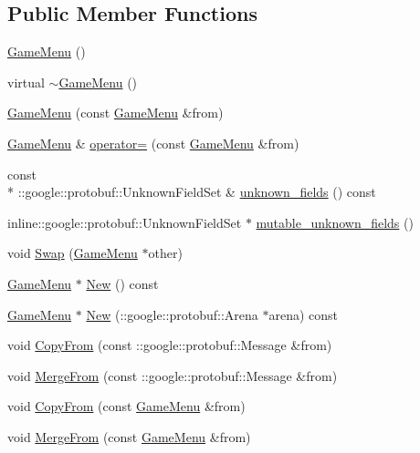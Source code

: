 \subsection*{Public Member Functions}
\begin{DoxyCompactItemize}
\item 
\hyperlink{class_game_menu_ae31c50148abf655297a2a3eab53c15a3}{Game\-Menu} ()
\item 
virtual \hyperlink{class_game_menu_a70ac0e31f882993f09eb1bdbdd352a56}{$\sim$\-Game\-Menu} ()
\item 
\hyperlink{class_game_menu_a0a1b44357508921c4f6edee476abb7b1}{Game\-Menu} (const \hyperlink{class_game_menu}{Game\-Menu} \&from)
\item 
\hyperlink{class_game_menu}{Game\-Menu} \& \hyperlink{class_game_menu_aaaf4f50a1d43e387811424fb4b09f93e}{operator=} (const \hyperlink{class_game_menu}{Game\-Menu} \&from)
\item 
const \\*
\-::google\-::protobuf\-::\-Unknown\-Field\-Set \& \hyperlink{class_game_menu_a1eaa869160e0897331da0ec3c015fec6}{unknown\-\_\-fields} () const 
\item 
inline\-::google\-::protobuf\-::\-Unknown\-Field\-Set $\ast$ \hyperlink{class_game_menu_a4092f328998bb9659d48903db1243b07}{mutable\-\_\-unknown\-\_\-fields} ()
\item 
void \hyperlink{class_game_menu_a8ecb2f60b010cbf56bf1f1c1756fd4cf}{Swap} (\hyperlink{class_game_menu}{Game\-Menu} $\ast$other)
\item 
\hyperlink{class_game_menu}{Game\-Menu} $\ast$ \hyperlink{class_game_menu_a44324114e8f5f3497fbff764ffbaec66}{New} () const 
\item 
\hyperlink{class_game_menu}{Game\-Menu} $\ast$ \hyperlink{class_game_menu_aa42d2be609f8e769b721b39d7857f1ea}{New} (\-::google\-::protobuf\-::\-Arena $\ast$arena) const 
\item 
void \hyperlink{class_game_menu_a13d4e96e0878e9bc0f848bcc4a5c9775}{Copy\-From} (const \-::google\-::protobuf\-::\-Message \&from)
\item 
void \hyperlink{class_game_menu_a82f6ca7995e5bc16aa40e02cc35226f3}{Merge\-From} (const \-::google\-::protobuf\-::\-Message \&from)
\item 
void \hyperlink{class_game_menu_a785301f9d4c73689d7aa3115680e870e}{Copy\-From} (const \hyperlink{class_game_menu}{Game\-Menu} \&from)
\item 
void \hyperlink{class_game_menu_a8ebfff6cb9a723430dbfdd50903bc411}{Merge\-From} (const \hyperlink{class_game_menu}{Game\-Menu} \&from)

\end{DoxyCompactItemize}
